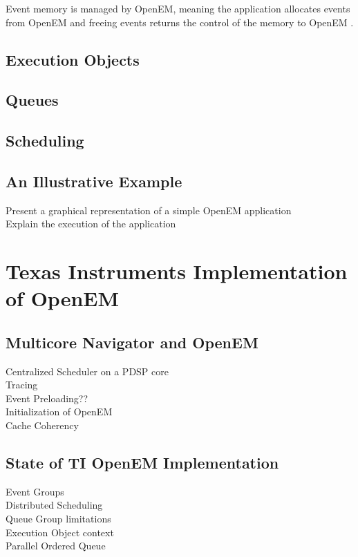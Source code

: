 Event memory is managed by OpenEM, meaning the application allocates events
from OpenEM and freeing events returns the control of the memory to OpenEM
\cite{openemintro}.
\subsection{Execution Objects}
\label{subsec:eos}
\subsection{Queues}
\label{subsec:queues}
\subsection{Scheduling}
\label{subsec:schedule}
\subsection{An Illustrative Example}
\label{subsec:example}
Present a graphical representation of a simple OpenEM application\\
Explain the execution of the application


\section{Texas Instruments Implementation of OpenEM}
\subsection{Multicore Navigator and OpenEM}
Centralized Scheduler on a PDSP core\\
Tracing\\
Event Preloading??\\
Initialization of OpenEM\\
Cache Coherency
\subsection{State of TI OpenEM Implementation}
Event Groups\\
Distributed Scheduling\\
Queue Group limitations\\
Execution Object context\\
Parallel Ordered Queue\\


